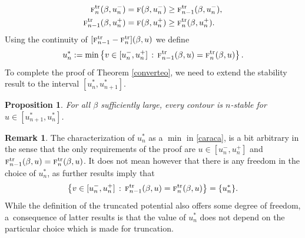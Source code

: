 \documentclass[JEP,XML,SOM,Unicode, NoFloatCountersInSection]{cedram}
\newcommand{\sep}{\,:\,}
\numberwithin{equation}{section}
\theoremstyle{plain}
\newtheorem{proposition}[theorem]{Proposition}
\theoremstyle{definition}
\newtheorem{rem}[theorem]{Remark}
\newcommand{\gb}{\beta}
\newcommand{\tr}{\mathrm{tr}}
\newcommand{\tf}{\textsc{f}}
\begin{document}
\begin{equation*}\begin{split}
\tf^{\tr}_{n}(\gb,u^-_n)&=\tf(\gb,u^-_n)\ge \tf^{\tr}_{n-1}(\gb,u^-_n),\\
\tf^{\tr}_{n-1}(\gb,u^+_n)&=\tf(\gb,u^+_n)\ge \tf^{\tr}_{n}(\gb,u^+_n).
\end{split}\end{equation*}
Using the continuity of $[\tf^{\tr}_{n-1}-\tf^{\tr}_{n}](\gb,u)$ we define
\begin{equation}\label{caraca}
u^*_n:=\min\left\{v\in [u^-_n,u^+_n] \sep \tf^{\tr}_{n-1}(\gb,u)=\tf^{\tr}_{n}(\gb,u) \right\}.
\end{equation}
To complete the proof of Theorem \ref{converteo}, we need to extend the stability result to the interval $[u^*_n,u^*_{n+1}]$.
\begin{proposition}\label{mejor}
For all $\gb$ sufficiently large,
every contour is $n$-stable for $u\in[u^*_{n+1},u^*_n]$.
\end{proposition}

\begin{rem}
The characterization of $u^*_n$ as a $\min$ in \eqref{caraca}, is a bit arbitrary in the sense that the only requirements of the proof are $u\in [u^-_n,u^+_n]$ and
$\tf^{\tr}_{n-1}(\gb,u)=\tf^{\tr}_{n}(\gb,u)$. It does not mean however that there is any freedom in the choice of $u^*_n$,
as further results imply that
\begin{equation*}%
\left\{v\in [u^-_n,u^+_n] \sep \tf^{\tr}_{n-1}(\gb,u)=\tf^{\tr}_{n}(\gb,u) \right\}=\{u^*_n\}.
\end{equation*}
While the definition of the truncated potential also offers some degree of freedom, a~consequence of latter results is that the value of $u^*_n$ does not depend on the particular choice which is made for truncation.
\end{rem}
\end{document}
